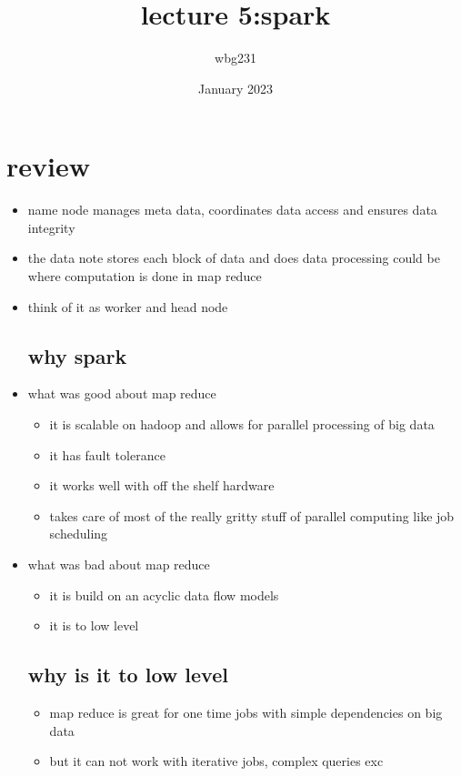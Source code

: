 \documentclass{article}
\title{lecture 5:spark  }
\author{wbg231 }
\date{January 2023}
\begin{document}
\maketitle

\section{review}
\begin{itemize}
\item name node manages meta data, coordinates data access and ensures data integrity 
\item the data note stores each block of data and does data processing could be where computation is done in map reduce 
\item think of it as worker and head node 
\subsection*{why spark}
\item what was good about map reduce
\begin{itemize}
    \item it is scalable on hadoop and allows for parallel processing of big data
    \item it has fault tolerance 
    \item it works well with off the shelf hardware 
    \item takes care of most of the really gritty stuff of parallel computing like job scheduling 
\end{itemize}
\item what was bad about map reduce
\begin{itemize}
    \item it is build on an acyclic data flow models
    \item it is to low level
\end{itemize}
\subsection*{why is it to low level}
\begin{itemize}
    \item map reduce is great for one time jobs with simple dependencies on big data
    \item but it can not work with iterative jobs, complex queries exc  
\end{itemize}

\end{itemize}
\end{document}

